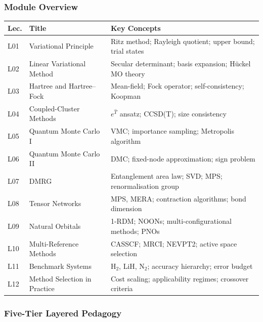 \documentclass[11pt,a4paper]{article}
\begin{document}
\subsubsection*{Module Overview}

{\footnotesize
\begin{center}
\begin{tabular}{@{}lp{4.2cm}p{6.8cm}@{}}
\toprule
\textbf{Lec.} & \textbf{Title} & \textbf{Key Concepts}\\
\midrule
L01 & Variational Principle & Ritz method; Rayleigh quotient; upper bound; trial states\\
L02 & Linear Variational Method & Secular determinant; basis expansion; H\"uckel MO theory\\
L03 & Hartree and Hartree--Fock & Mean-field; Fock operator; self-consistency; Koopman\\
L04 & Coupled-Cluster Methods & $e^{\hat{T}}$ ansatz; CCSD(T); size consistency\\
L05 & Quantum Monte Carlo I & VMC; importance sampling; Metropolis algorithm\\
L06 & Quantum Monte Carlo II & DMC; fixed-node approximation; sign problem\\
\midrule
L07 & DMRG & Entanglement area law; SVD; MPS; renormalisation group\\
L08 & Tensor Networks & MPS, MERA; contraction algorithms; bond dimension\\
L09 & Natural Orbitals & 1-RDM; NOONs; multi-configurational methods; PNOs\\
L10 & Multi-Reference Methods & CASSCF; MRCI; NEVPT2; active space selection\\
L11 & Benchmark Systems & H$_2$, LiH, N$_2$; accuracy hierarchy; error budget\\
L12 & Method Selection in Practice & Cost scaling; applicability regimes; crossover criteria\\
\bottomrule
\end{tabular}
\end{center}
}

\subsubsection*{Five-Tier Layered Pedagogy}
\end{document}

